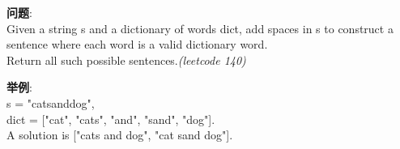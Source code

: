     
\begin{description}
    \item{\textbf{问题}}:\\
Given a string s and a dictionary of words dict, add spaces in s to construct a sentence where each word is a valid dictionary word.\\
Return all such possible sentences.\textit{(leetcode 140)}

    \item{\textbf{举例}}:\\
s = "catsanddog",\\
dict = ["cat", "cats", "and", "sand", "dog"].\\

A solution is ["cats and dog", "cat sand dog"].\\


\end{description}

